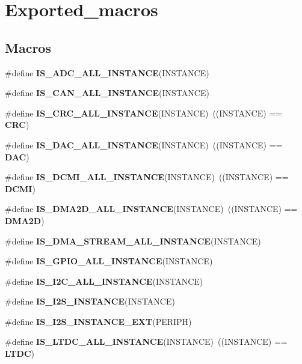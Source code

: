 \section{Exported\+\_\+macros}
\label{group__Exported__macros}
\subsection*{Macros}
\begin{DoxyCompactItemize}
\item 
\#define \textbf{ I\+S\+\_\+\+A\+D\+C\+\_\+\+A\+L\+L\+\_\+\+I\+N\+S\+T\+A\+N\+CE}(I\+N\+S\+T\+A\+N\+CE)
\item 
\#define \textbf{ I\+S\+\_\+\+C\+A\+N\+\_\+\+A\+L\+L\+\_\+\+I\+N\+S\+T\+A\+N\+CE}(I\+N\+S\+T\+A\+N\+CE)
\item 
\#define \textbf{ I\+S\+\_\+\+C\+R\+C\+\_\+\+A\+L\+L\+\_\+\+I\+N\+S\+T\+A\+N\+CE}(I\+N\+S\+T\+A\+N\+CE)~((I\+N\+S\+T\+A\+N\+CE) == \textbf{ C\+RC})
\item 
\#define \textbf{ I\+S\+\_\+\+D\+A\+C\+\_\+\+A\+L\+L\+\_\+\+I\+N\+S\+T\+A\+N\+CE}(I\+N\+S\+T\+A\+N\+CE)~((I\+N\+S\+T\+A\+N\+CE) == \textbf{ D\+AC})
\item 
\#define \textbf{ I\+S\+\_\+\+D\+C\+M\+I\+\_\+\+A\+L\+L\+\_\+\+I\+N\+S\+T\+A\+N\+CE}(I\+N\+S\+T\+A\+N\+CE)~((I\+N\+S\+T\+A\+N\+CE) == \textbf{ D\+C\+MI})
\item 
\#define \textbf{ I\+S\+\_\+\+D\+M\+A2\+D\+\_\+\+A\+L\+L\+\_\+\+I\+N\+S\+T\+A\+N\+CE}(I\+N\+S\+T\+A\+N\+CE)~((I\+N\+S\+T\+A\+N\+CE) == \textbf{ D\+M\+A2D})
\item 
\#define \textbf{ I\+S\+\_\+\+D\+M\+A\+\_\+\+S\+T\+R\+E\+A\+M\+\_\+\+A\+L\+L\+\_\+\+I\+N\+S\+T\+A\+N\+CE}(I\+N\+S\+T\+A\+N\+CE)
\item 
\#define \textbf{ I\+S\+\_\+\+G\+P\+I\+O\+\_\+\+A\+L\+L\+\_\+\+I\+N\+S\+T\+A\+N\+CE}(I\+N\+S\+T\+A\+N\+CE)
\item 
\#define \textbf{ I\+S\+\_\+\+I2\+C\+\_\+\+A\+L\+L\+\_\+\+I\+N\+S\+T\+A\+N\+CE}(I\+N\+S\+T\+A\+N\+CE)
\item 
\#define \textbf{ I\+S\+\_\+\+I2\+S\+\_\+\+I\+N\+S\+T\+A\+N\+CE}(I\+N\+S\+T\+A\+N\+CE)
\item 
\#define \textbf{ I\+S\+\_\+\+I2\+S\+\_\+\+I\+N\+S\+T\+A\+N\+C\+E\+\_\+\+E\+XT}(P\+E\+R\+I\+PH)
\item 
\#define \textbf{ I\+S\+\_\+\+L\+T\+D\+C\+\_\+\+A\+L\+L\+\_\+\+I\+N\+S\+T\+A\+N\+CE}(I\+N\+S\+T\+A\+N\+CE)~((I\+N\+S\+T\+A\+N\+CE) == \textbf{ L\+T\+DC})
\item 

\end{DoxyCompactItemize}
